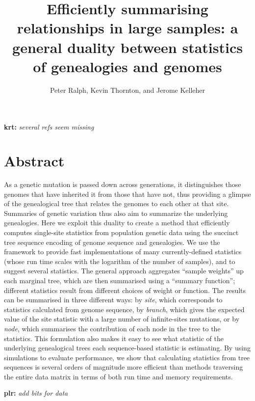 \documentclass{article}
\newcommand{\plr}[1]{{\color{blue}\textbf{plr:} \it #1}}
\newcommand{\krt}[1]{{\color{green}\textbf{krt:} \it #1}}
\begin{document}
\title{
    Efficiently summarising relationships in large samples:
    a general duality between statistics of genealogies and genomes}
\author{Peter Ralph, Kevin Thornton, and Jerome Kelleher}
\maketitle


\krt{several refs seem missing}


\section*{Abstract}

As a genetic mutation is passed down across generations,
it distinguishes those genomes that have inherited it from those that have not,
thus providing a glimpse of the genealogical tree that relates the genomes to each other at that site.
Summaries of genetic variation thus also aim to summarize the underlying genealogies.
Here we exploit this duality to create a method that efficiently computes single-site statistics
from population genetic data using the succinct tree sequence encoding
of genome sequence and genealogies.
We use the framework to provide fast implementations of many currently-defined statistics
(whose run time scales with the logarithm of the number of samples),
and to suggest several statistics.
The general approach aggregates ``sample weights'' up each marginal tree,
which are then summarised using a ``summary function'';
different statistics result from different choices of weight or function.
The results can be summarised in three different ways:
by \emph{site}, which corresponds to statistics calculated from genome sequence,
by \emph{branch}, which gives the expected value of the site statistic
with a large number of infinite-sites mutations,
or by \emph{node}, which summarises the contribution of each node in the tree to the statistics.
This formulation also makes it easy to see what statistic of the underlying genealogical trees
each sequence-based statistic is estimating.  By using simulations to evaluate performance, we 
show that calculating statistics from tree sequences is several orders of magnitude more efficient than
methods traversing the entire data matrix in terms of both run time and memory requirements.

\plr{add bits for data}
\end{document}
